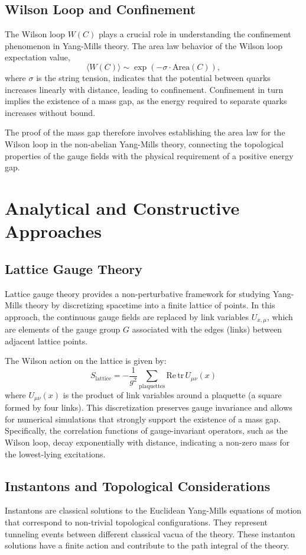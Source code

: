 \documentclass[11pt]{article}
\begin{document}
\subsection{Wilson Loop and Confinement}
The Wilson loop \( W(C) \) plays a crucial role in understanding the confinement phenomenon in Yang-Mills theory. The area law behavior of the Wilson loop expectation value,
\[
\langle W(C) \rangle \sim \exp(-\sigma \cdot \text{Area}(C)),
\]
where \( \sigma \) is the string tension, indicates that the potential between quarks increases linearly with distance, leading to confinement. Confinement in turn implies the existence of a mass gap, as the energy required to separate quarks increases without bound.

The proof of the mass gap therefore involves establishing the area law for the Wilson loop in the non-abelian Yang-Mills theory, connecting the topological properties of the gauge fields with the physical requirement of a positive energy gap.

\section{Analytical and Constructive Approaches}

\subsection{Lattice Gauge Theory}
Lattice gauge theory provides a non-perturbative framework for studying Yang-Mills theory by discretizing spacetime into a finite lattice of points. In this approach, the continuous gauge fields are replaced by link variables \( U_{x,\mu} \), which are elements of the gauge group \( G \) associated with the edges (links) between adjacent lattice points.

The Wilson action on the lattice is given by:
\[
S_{\text{lattice}} = -\frac{1}{g^2} \sum_{\text{plaquettes}} \text{Re}\, \text{tr}\, U_{\mu\nu}(x)
\]
where \( U_{\mu\nu}(x) \) is the product of link variables around a plaquette (a square formed by four links). This discretization preserves gauge invariance and allows for numerical simulations that strongly support the existence of a mass gap. Specifically, the correlation functions of gauge-invariant operators, such as the Wilson loop, decay exponentially with distance, indicating a non-zero mass for the lowest-lying excitations.

\subsection{Instantons and Topological Considerations}
Instantons are classical solutions to the Euclidean Yang-Mills equations of motion that correspond to non-trivial topological configurations. They represent tunneling events between different classical vacua of the theory. These instanton solutions have a finite action and contribute to the path integral of the theory.
\end{document}

